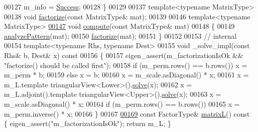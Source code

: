 \begin{DoxyCode}
00127       m\_info = \hyperlink{group__enums_gga85fad7b87587764e5cf6b513a9e0ee5ea52581b035f4b59c203b8ff999ef5fcea}{Success};
00128     \}
00129     
00137     \textcolor{keyword}{template}<\textcolor{keyword}{typename} MatrixType>
00138     \textcolor{keywordtype}{void} \hyperlink{class_eigen_1_1_incomplete_cholesky_ac39c75ff7ca5d2db9a9f03b937e12601}{factorize}(\textcolor{keyword}{const} MatrixType& mat);
00139     
00146     \textcolor{keyword}{template}<\textcolor{keyword}{typename} MatrixType>
\hyperlink{class_eigen_1_1_incomplete_cholesky_a7966bedeebbeaa7a8fe4dd1da3797a0b}{00147}     \textcolor{keywordtype}{void} \hyperlink{class_eigen_1_1_incomplete_cholesky_a7966bedeebbeaa7a8fe4dd1da3797a0b}{compute}(\textcolor{keyword}{const} MatrixType& mat)
00148     \{
00149       \hyperlink{class_eigen_1_1_incomplete_cholesky_a702560ecdddef77dc51d20ab22bd974e}{analyzePattern}(mat);
00150       \hyperlink{class_eigen_1_1_incomplete_cholesky_ac39c75ff7ca5d2db9a9f03b937e12601}{factorize}(mat);
00151     \}
00152     
00153     \textcolor{comment}{// internal}
00154     \textcolor{keyword}{template}<\textcolor{keyword}{typename} Rhs, \textcolor{keyword}{typename} Dest>
00155     \textcolor{keywordtype}{void} \_solve\_impl(\textcolor{keyword}{const} Rhs& b, Dest& x)\textcolor{keyword}{ const}
00156 \textcolor{keyword}{    }\{
00157       eigen\_assert(m\_factorizationIsOk && \textcolor{stringliteral}{"factorize() should be called first"});
00158       \textcolor{keywordflow}{if} (m\_perm.rows() == b.rows())  x = m\_perm * b;
00159       \textcolor{keywordflow}{else}                            x = b;
00160       x = m\_scale.asDiagonal() * x;
00161       x = m\_L.template triangularView<Lower>().\hyperlink{group___sparse_core___module_a4a66e9498b06e3ec4ec36f06b26d4e8f}{solve}(x);
00162       x = m\_L.adjoint().template triangularView<Upper>().\hyperlink{group___sparse_core___module_a4a66e9498b06e3ec4ec36f06b26d4e8f}{solve}(x);
00163       x = m\_scale.asDiagonal() * x;
00164       \textcolor{keywordflow}{if} (m\_perm.rows() == b.rows())
00165         x = m\_perm.inverse() * x;
00166     \}
00167 
\hyperlink{class_eigen_1_1_incomplete_cholesky_a7d1f1878505fd1862e6f2286d27ff09a}{00169}     \textcolor{keyword}{const} FactorType& \hyperlink{class_eigen_1_1_incomplete_cholesky_a7d1f1878505fd1862e6f2286d27ff09a}{matrixL}()\textcolor{keyword}{ const }\{ eigen\_assert(\textcolor{stringliteral}{"m\_factorizationIsOk"}); \textcolor{keywordflow}{return} m\_L; \}

\end{DoxyCode}
